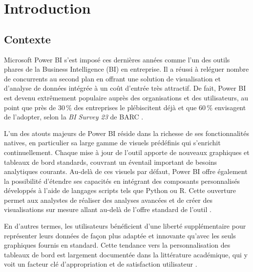 \chapter{Introduction}

\section{Contexte}

Microsoft Power BI s’est imposé ces dernières années comme l’un des outils phares de la Business Intelligence (BI) en entreprise. Il a réussi à reléguer nombre de concurrents au second plan en offrant une solution de visualisation et d’analyse de données intégrée à un coût d’entrée très attractif. De fait, Power BI est devenu extrêmement populaire auprès des organisations et des utilisateurs, au point que près de 30\,\% des entreprises le plébiscitent déjà et que 60\,\% envisagent de l’adopter, selon la \emph{BI Survey 23} de BARC \parencite{Spies2023,Tirupati2023}.  

L’un des atouts majeurs de Power BI réside dans la richesse de ses fonctionnalités natives, en particulier sa large gamme de visuels prédéfinis qui s’enrichit continuellement. Chaque mise à jour de l’outil apporte de nouveaux graphiques et tableaux de bord standards, couvrant un éventail important de besoins analytiques courants. Au-delà de ces visuels par défaut, Power BI offre également la possibilité d’étendre ses capacités en intégrant des composants personnalisés développés à l’aide de langages scripts tels que Python ou R. Cette ouverture permet aux analystes de réaliser des analyses avancées et de créer des visualisations sur mesure allant au-delà de l’offre standard de l’outil \parencite{Dossier2024}.  

En d’autres termes, les utilisateurs bénéficient d’une liberté supplémentaire pour représenter leurs données de façon plus adaptée et innovante qu’avec les seuls graphiques fournis en standard. Cette tendance vers la personnalisation des tableaux de bord est largement documentée dans la littérature académique, qui y voit un facteur clé d’appropriation et de satisfaction utilisateur \parencite{Amyrotos2024}.  

